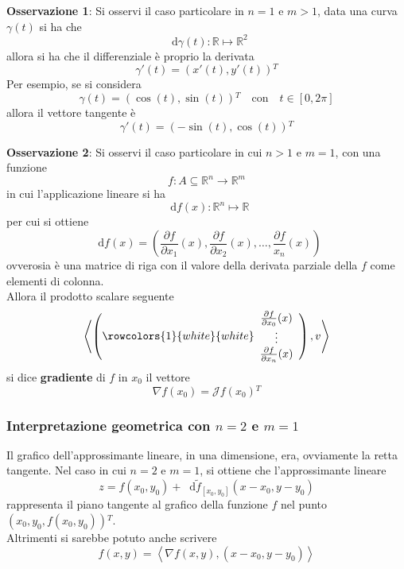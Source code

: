 \documentclass[a4paper]{extarticle}
\newcommand*\dif{\mathop{}\!\mathrm{d}}
\begin{document}
\vspace{2em}
\noindent
\textbf{Osservazione 1}: Si osservi il caso particolare in $n=1$ e $m>1$, data una curva $\gamma(t)$ si ha che
\[\dif \gamma(t) : \mathbb{R} \longmapsto \mathbb{R}^2\]
allora si ha che il differenziale è proprio la derivata
\[\gamma'(t) = \left(x'(t),y'(t)\right){^T}\]
Per esempio, se si considera
\[\gamma(t)=(\cos(t),\sin(t)){^T} \hspace{1em} \text{con} \hspace{1em} t \in [0,2\pi]\]
allora il vettore tangente è
\[\gamma'(t)=\left(-\sin(t),\cos(t)\right){^T}\]

\vspace{2em}
\noindent
\textbf{Osservazione 2}: Si osservi il caso particolare in cui $n>1$ e $m=1$, con una funzione
\[f : A \subseteq \mathbb{R}^n \rightarrow \mathbb{R}^m\]
in cui l'applicazione lineare si ha
\[\dif f(x) : \mathbb{R}^n \longmapsto \mathbb{R}\]
per cui si ottiene
\[\dif f(x) = \left(\frac{\partial f}{\partial x_1}(x), \frac{\partial f}{\partial x_2}(x), \dots, \frac{\partial f}{x_n}(x) \right)\]
ovverosia è una matrice di riga con il valore della derivata parziale della $f$ come elementi di colonna.\\
Allora il prodotto scalare seguente
\[\left<
    \left(
        \rowcolors{1}{white}{white}
        \begin{array}{c}
            \frac{\partial f}{\partial x_0}(x)\\
            \vdots\\
            \frac{\partial f}{\partial x_n}(x)
        \end{array}
    \right), v
\right>\]
si dice \textbf{gradiente} di $f$ in $x_0$ il vettore
\[\nabla f(x_0) = \mathcal{J}f(x_0){^T}\]

\vspace{2em}
\noindent
\subsubsection{Interpretazione geometrica con $n=2$ e $m=1$}
Il grafico dell'approssimante lineare, in una dimensione, era, ovviamente la retta tangente. Nel caso in cui $n=2$ e $m=1$, si ottiene che l'approssimante lineare
\[z=f(x_0,y_0) + \dif \widetilde{f}_{[x_0,y_0]}(x-x_0,y-y_0)\]
rappresenta il piano tangente al grafico della funzione $f$ nel punto $\left(x_0,y_0,f(x_0,y_0)\right){^T}$.\\
Altrimenti si sarebbe potuto anche scrivere
\[f(x,y) = \left<\nabla f(x,y), (x-x_0,y-y_0)\right>\]
\end{document}
